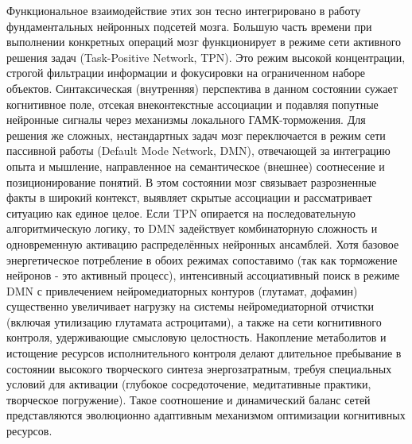 \documentclass[12pt]{article}
\begin{document}
Функциональное взаимодействие этих зон тесно интегрировано в работу фундаментальных нейронных подсетей мозга. Большую часть времени при выполнении конкретных операций мозг функционирует в режиме сети активного решения задач (Task-Positive Network, TPN). Это режим высокой концентрации, строгой фильтрации информации и фокусировки на ограниченном наборе объектов. Синтаксическая (внутренняя) перспектива в данном состоянии сужает когнитивное поле, отсекая внеконтекстные ассоциации и подавляя попутные нейронные сигналы через механизмы локального ГАМК-торможения. Для решения же сложных, нестандартных задач мозг переключается в режим сети пассивной работы (Default Mode Network, DMN), отвечающей за интеграцию опыта и мышление, направленное на семантическое (внешнее) соотнесение и позиционирование понятий. В этом состоянии мозг связывает разрозненные факты в широкий контекст, выявляет скрытые ассоциации и рассматривает ситуацию как единое целое. Если TPN опирается на последовательную алгоритмическую логику, то DMN задействует комбинаторную сложность и одновременную активацию распределённых нейронных ансамблей. Хотя базовое энергетическое потребление в обоих режимах сопоставимо (так как торможение нейронов - это активный процесс), интенсивный ассоциативный поиск в режиме DMN с привлечением нейромедиаторных контуров (глутамат, дофамин) существенно увеличивает нагрузку на системы нейромедиаторной отчистки (включая утилизацию глутамата астроцитами), а также на сети когнитивного контроля, удерживающие смысловую целостность. Накопление метаболитов и истощение ресурсов исполнительного контроля делают длительное пребывание в состоянии высокого творческого синтеза энергозатратным, требуя специальных условий для активации (глубокое сосредоточение, медитативные практики, творческое погружение). Такое соотношение и динамический баланс сетей представляются эволюционно адаптивным механизмом оптимизации когнитивных ресурсов. 
\end{document}
